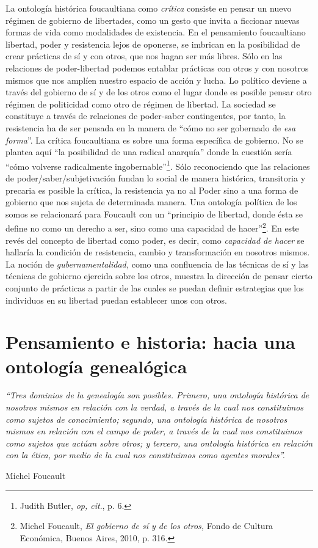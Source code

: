 La ontología histórica foucaultiana como \emph{crítica} consiste en pensar un nuevo régimen de gobierno de libertades, como un gesto que invita a ficcionar nuevas formas de vida como modalidades de existencia. En el pensamiento foucaultiano libertad, poder y resistencia lejos de oponerse, se imbrican en la posibilidad de crear prácticas de sí y con otros, que nos hagan ser más libres. Sólo en las relaciones de poder-libertad podemos entablar prácticas con otros y con nosotros mismos que nos amplíen nuestro espacio de acción y lucha. Lo político deviene a través del gobierno de sí y de los otros como el lugar donde es posible pensar otro régimen de politicidad como otro de régimen de libertad. La sociedad se constituye a través de relaciones de poder-saber contingentes, por tanto, la resistencia ha de ser pensada en la manera de \enquote{cómo no ser gobernado de \emph{esa forma}}. La crítica foucaultiana es sobre una forma específica de gobierno. No se plantea aquí \enquote{la posibilidad de una radical anarquía} donde la cuestión sería \enquote{cómo volverse radicalmente ingobernable}\footnote{Judith Butler, \emph{op, cit}., p. 6.}. Sólo reconociendo que las relaciones de poder/saber/subjetivación fundan lo social de manera histórica, transitoria y precaria es posible la crítica, la resistencia ya no al Poder sino a una forma de gobierno que nos sujeta de determinada manera. Una ontología política de los somos se relacionará para Foucault con un \enquote{principio de libertad, donde ésta se define no como un derecho a ser, sino como una capacidad de hacer}\footnote{Michel Foucault, \emph{El gobierno de sí y de los otros,} Fondo de Cultura Económica, Buenos Aires, 2010, p. 316.}. En este revés del concepto de libertad como poder, es decir, como \emph{capacidad de hacer} se hallaría la condición de resistencia, cambio y transformación en nosotros mismos. La noción de \emph{gubernamentalidad,} como una confluencia de las técnicas de sí y las técnicas de gobierno ejercida sobre los otros, muestra la dirección de pensar cierto conjunto de prácticas a partir de las cuales se puedan definir estrategias que los individuos en su libertad puedan establecer unos con otros.

\section{Pensamiento e historia: hacia una ontología genealógica}

\epigraph{\emph{\enquote{Tres dominios de la genealogía son posibles. Primero, una ontología histórica de nosotros mismos en relación con la verdad, a través de la cual nos constituimos como sujetos de conocimiento; segundo, una ontología histórica de nosotros mismos en relación con el campo de poder, a través de la cual nos constituimos como sujetos que actúan sobre otros; y tercero, una ontología histórica en relación con la ética, por medio de la cual nos constituimos como agentes morales}.}}{Michel Foucault}

